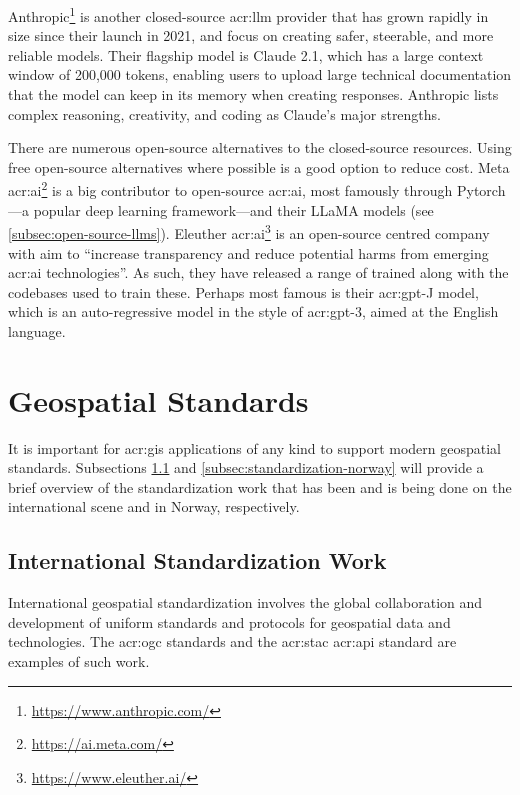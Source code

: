 Anthropic\footnote{\url{https://www.anthropic.com/}} is another closed-source \acrshort{acr:llm} provider that has grown rapidly in size since their launch in 2021, and focus on creating safer, steerable, and more reliable models. Their flagship model is Claude 2.1, which has a large context window of 200,000 tokens, enabling users to upload large technical documentation that the model can keep in its memory when creating responses. Anthropic lists complex reasoning, creativity, and coding as Claude's major strengths.

There are numerous open-source alternatives to the closed-source resources. Using free open-source alternatives where possible is a good option to reduce cost. Meta \acrshort{acr:ai}\footnote{\url{https://ai.meta.com/}} is a big contributor to open-source \acrshort{acr:ai}, most famously through Pytorch---a popular deep learning framework---and their LLaMA models (see \autoref{subsec:open-source-llms}). Eleuther \acrshort{acr:ai}\footnote{\url{https://www.eleuther.ai/}} is an open-source centred company with aim to \enquote{increase transparency and reduce potential harms from emerging \acrshort{acr:ai} technologies}. As such, they have released a range of trained  along with the codebases used to train these. Perhaps most famous is their \acrshort{acr:gpt}-J model, which is an auto-regressive model in the style of \acrshort{acr:gpt}-3, aimed at the English language.

\section{Geospatial Standards}\label{sec:geospatial-standards}

It is important for \acrshort{acr:gis} applications of any kind to support modern geospatial standards. Subsections \ref{subsec:standardization-international} and \ref{subsec:standardization-norway} will provide a brief overview of the standardization work that has been and is being done on the international scene and in Norway, respectively.

\subsection{International Standardization Work}\label{subsec:standardization-international}

International geospatial standardization involves the global collaboration and development of uniform standards and protocols for geospatial data and technologies. The \acrshort{acr:ogc} standards and the \acrshort{acr:stac} \acrshort{acr:api} standard are examples of such work.

